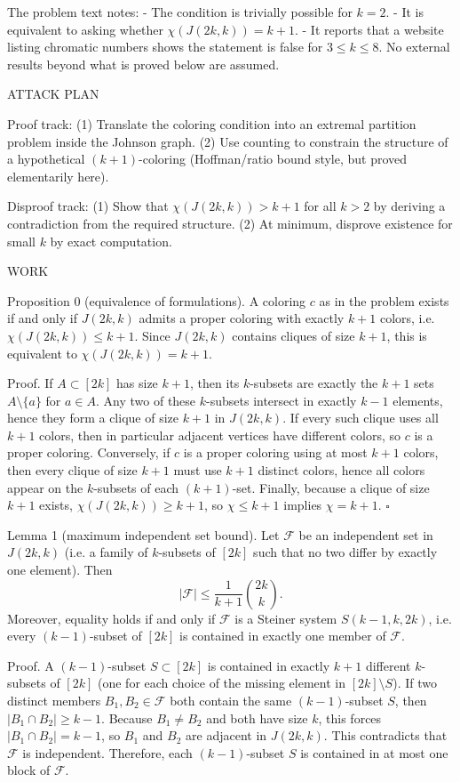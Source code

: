 The problem text notes:
- The condition is trivially possible for $k=2$.
- It is equivalent to asking whether $\chi(J(2k,k))=k+1$.
- It reports that a website listing chromatic numbers shows the statement is false for $3\le k\le 8$.
No external results beyond what is proved below are assumed.

ATTACK PLAN

Proof track:
(1) Translate the coloring condition into an extremal partition problem inside the Johnson graph.
(2) Use counting to constrain the structure of a hypothetical $(k+1)$-coloring (Hoffman/ratio bound style, but proved elementarily here).

Disproof track:
(1) Show that $\chi(J(2k,k))>k+1$ for all $k>2$ by deriving a contradiction from the required structure.
(2) At minimum, disprove existence for small $k$ by exact computation.

WORK

Proposition 0 (equivalence of formulations).
A coloring $c$ as in the problem exists if and only if $J(2k,k)$ admits a proper coloring with exactly $k+1$ colors, i.e. $\chi(J(2k,k))\le k+1$.
Since $J(2k,k)$ contains cliques of size $k+1$, this is equivalent to $\chi(J(2k,k))=k+1$.

Proof.
If $A\subset[2k]$ has size $k+1$, then its $k$-subsets are exactly the $k+1$ sets $A\setminus\{a\}$ for $a\in A$.
Any two of these $k$-subsets intersect in exactly $k-1$ elements, hence they form a clique of size $k+1$ in $J(2k,k)$.
If every such clique uses all $k+1$ colors, then in particular adjacent vertices have different colors, so $c$ is a proper coloring.
Conversely, if $c$ is a proper coloring using at most $k+1$ colors, then every clique of size $k+1$ must use $k+1$ distinct colors, hence all colors appear on the $k$-subsets of each $(k+1)$-set.
Finally, because a clique of size $k+1$ exists, $\chi(J(2k,k))\ge k+1$, so $\chi\le k+1$ implies $\chi=k+1$.
$\square$

Lemma 1 (maximum independent set bound).
Let $\mathcal{F}$ be an independent set in $J(2k,k)$ (i.e. a family of $k$-subsets of $[2k]$ such that no two differ by exactly one element).
Then
\[
|\mathcal{F}|\le \frac{1}{k+1}\binom{2k}{k}.
\]
Moreover, equality holds if and only if $\mathcal{F}$ is a Steiner system $S(k-1,k,2k)$, i.e. every $(k-1)$-subset of $[2k]$ is contained in exactly one member of $\mathcal{F}$.

Proof.
A $(k-1)$-subset $S\subset[2k]$ is contained in exactly $k+1$ different $k$-subsets of $[2k]$ (one for each choice of the missing element in $[2k]\setminus S$).
If two distinct members $B_1,B_2\in\mathcal{F}$ both contain the same $(k-1)$-subset $S$, then $|B_1\cap B_2|\ge k-1$.
Because $B_1\ne B_2$ and both have size $k$, this forces $|B_1\cap B_2|=k-1$, so $B_1$ and $B_2$ are adjacent in $J(2k,k)$.
This contradicts that $\mathcal{F}$ is independent.
Therefore, each $(k-1)$-subset $S$ is contained in at most one block of $\mathcal{F}$.

